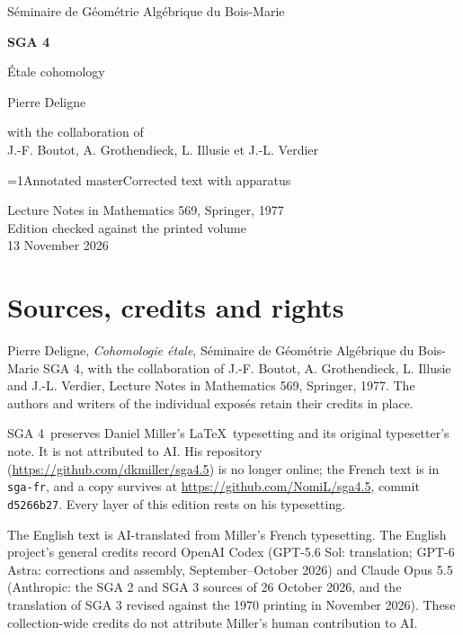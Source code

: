 \documentclass[oneside]{book}
\theoremstyle{sga-source}
\theoremstyle{sga-source-dash}
\theoremstyle{sga-source-dotdash}
\theoremstyle{sga-source-number-note-dash}
\theoremstyle{sga-source-note-number-dotdash}
\theoremstyle{sga-source-example-dotdash}
\theoremstyle{sga-source-inline-number}
\theoremstyle{sga-source-bare-number}
\theoremstyle{sga-source}
\providecommand\EditionIsMaster{1}
\begin{document}
\begin{titlepage}
\centering
\vspace*{2cm}
{\Large Séminaire de Géométrie Algébrique du Bois-Marie\par}
\vspace{0.7cm}
{\Huge\bfseries SGA 4\textonehalf\par}
\vspace{0.8cm}
{\huge Étale cohomology\par}
\vspace{1cm}
{\Large Pierre Deligne\par}
\vspace{0.5cm}
with the collaboration of\\[0.3em]
J.-F. Boutot, A. Grothendieck, L. Illusie et J.-L. Verdier
\vfill
{\Large \ifnum\EditionIsMaster=1\relax Annotated master\else Corrected text with apparatus\fi\par}
\vspace{0.7cm}
Lecture Notes in Mathematics 569, Springer, 1977\\[0.4em]
Edition checked against the printed volume\\
13 November 2026
\end{titlepage}

\chapter*{Sources, credits and rights}
Pierre Deligne, \emph{Cohomologie étale}, Séminaire de Géométrie Algébrique
du Bois-Marie SGA 4\textonehalf, with the collaboration of J.-F. Boutot,
A. Grothendieck, L. Illusie and J.-L. Verdier, Lecture Notes in Mathematics
569, Springer, 1977. The authors and writers of the individual exposés
retain their credits in place.

\medskip
SGA 4\textonehalf\ preserves Daniel Miller’s \LaTeX\ typesetting and its
original typesetter’s note. It is not attributed to AI. His repository
(\url{https://github.com/dkmiller/sga4.5}) is no longer online; the French
text is in \texttt{sga-fr}, and a copy survives at
\url{https://github.com/NomiL/sga4.5}, commit \texttt{d5266b27}.
Every layer of this edition rests on his typesetting.

\medskip
The English text is AI-translated from Miller’s French typesetting.
The English project’s general credits record OpenAI Codex (GPT-5.6 Sol:
translation; GPT-6 Astra: corrections and assembly, September--October
2026) and Claude Opus 5.5 (Anthropic: the SGA 2 and SGA 3 sources of
26 October 2026, and the translation of SGA 3 revised against the 1970
printing in November 2026). These collection-wide credits do not attribute
Miller’s human contribution to AI.
\end{document}
